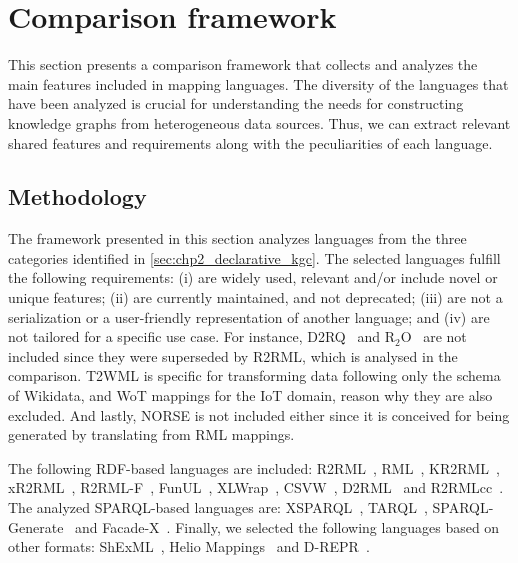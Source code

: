 \section{Comparison framework}
\label{sec:chp4_framework}


This section presents a comparison framework that collects and analyzes the main features included in mapping languages. The diversity of the languages that have been analyzed is crucial for understanding the needs for constructing knowledge graphs from heterogeneous data sources. Thus, we can extract relevant shared features and requirements along with the peculiarities of each language. 


\subsection{Methodology}

The framework presented in this section analyzes languages from the three categories identified in \cref{sec:chp2_declarative_kgc}. 
The selected languages fulfill the following requirements: 
(i) are widely used, relevant and/or include novel or unique features; 
(ii) are currently maintained, and not deprecated; 
(iii) are not a serialization or a user-friendly representation of another language; and 
(iv) are not tailored for a specific use case. 
For instance, D2RQ~\parencite{bizer2004d2rq} and R$_2$O~\parencite{barrasa2004r2o} are not included since they were superseded by R2RML, which is analysed in the comparison. 
T2WML is specific for transforming data following only the schema of Wikidata, and WoT mappings for the IoT domain, reason why they are also excluded.
And lastly, NORSE is not included either since it is conceived for being generated by translating from RML mappings. 



The following RDF-based languages are included: R2RML~\parencite{das2012r2rml}, RML~\parencite{Dimou2014rml}, KR2RML~\parencite{slepicka2015kr2rml}, xR2RML~\parencite{michel2015xr2rml}, R2RML-F~\parencite{debruyne2016r2rmlf}, FunUL~\parencite{junior2016funul},  XLWrap~\parencite{langegger2009xlwrap}, CSVW~\parencite{Tennison2015csvw}, D2\-RML~\parencite{chortaras2018d2rml} and R2RMLcc~\parencite{debruyne2017R2RML-collections}. The analyzed SPARQL-based languages are: XSPARQL~\parencite{Bischof2012xsparql}, TARQL~\parencite{tarql},  SPARQL-Gene\-rate~\parencite{Lefrancois2017sparqlgenerate} and Facade-X~\parencite{daga2021facade}. Finally, we selected the following languages based on other formats: ShExML~\parencite{Garcia-Gonzalez2020shexml}, Helio Mappings~\parencite{cimmino2022helio} and D-REPR~\parencite{Vu2019d-repr}.  


